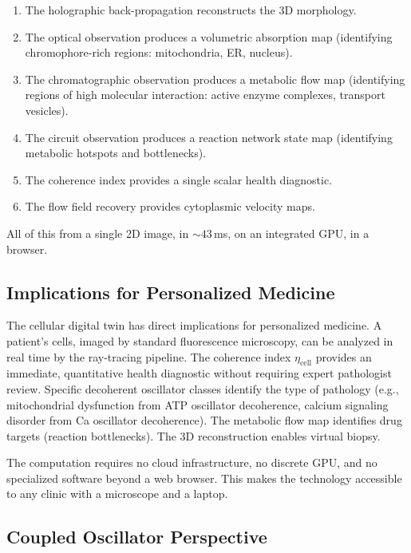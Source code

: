 \documentclass[11pt,twocolumn,a4paper]{article}
\newcommand{\etacell}{\eta_{\mathrm{cell}}}
\begin{document}
\begin{enumerate}[leftmargin=*,itemsep=2pt]
\item The holographic back-propagation reconstructs the 3D
  morphology.
\item The optical observation produces a volumetric absorption map
  (identifying chromophore-rich regions: mitochondria, ER, nucleus).
\item The chromatographic observation produces a metabolic flow map
  (identifying regions of high molecular interaction: active enzyme
  complexes, transport vesicles).
\item The circuit observation produces a reaction network state map
  (identifying metabolic hotspots and bottlenecks).
\item The coherence index provides a single scalar health diagnostic.
\item The flow field recovery provides cytoplasmic velocity maps.
\end{enumerate}

All of this from a single 2D image, in $\sim\!43$\,ms, on an
integrated GPU, in a browser.

\subsection{Implications for Personalized Medicine}

The cellular digital twin has direct implications for personalized
medicine. A patient's cells, imaged by standard fluorescence microscopy,
can be analyzed in real time by the ray-tracing pipeline. The coherence
index $\etacell$ provides an immediate, quantitative health diagnostic
without requiring expert pathologist review. Specific decoherent
oscillator classes identify the type of pathology (e.g., mitochondrial
dysfunction from ATP oscillator decoherence, calcium signaling disorder
from Ca oscillator decoherence). The metabolic flow map identifies
drug targets (reaction bottlenecks). The 3D reconstruction enables
virtual biopsy.

The computation requires no cloud infrastructure, no discrete GPU, and
no specialized software beyond a web browser. This makes the technology
accessible to any clinic with a microscope and a laptop.

\subsection{Coupled Oscillator Perspective}
\end{document}
